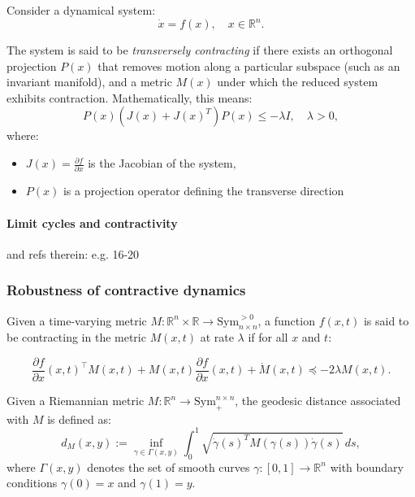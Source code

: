 \documentclass{article}
\theoremstyle{definition} \newtheorem{definition}{Definition}
\theoremstyle{remark} \newtheorem{remark}{Remark}
\newcounter{ct}
\begin{document}
Consider a dynamical system:
\begin{equation}
    \dot{x} = f(x), \quad x \in \mathbb{R}^n.
\end{equation}

The system is said to be \textit{transversely contracting} if there exists an orthogonal projection $P(x)$ that removes motion along a particular subspace (such as an invariant manifold), and a metric $M(x)$ under which the reduced system exhibits contraction. Mathematically, this means:
\begin{equation}
    P(x) (J(x) + J(x)^T) P(x) \leq -\lambda I, \quad \lambda > 0,
\end{equation}
where:
\begin{itemize}
    \item $J(x) = \frac{\partial f}{\partial x}$ is the Jacobian of the system,
    \item $P(x)$ is a projection operator defining the transverse direction
\end{itemize}


\paragraph{Limit cycles and contractivity}%
\citep{manchester2014transverse} and refs therein: e.g. 16-20


\subsubsection{Robustness of contractive dynamics}\label{sec:contractive_robustness}

Given a time-varying metric \( M : \mathbb{R}^n \times \mathbb{R} \to \text{Sym}_{n \times n}^{>0} \), a function \( f(x,t) \) is said to be contracting in the metric \( M(x,t) \) at rate \( \lambda \) if for all \( x \) and \( t \):

\[
\frac{\partial f}{\partial x} (x,t)^{\top} M(x,t) + M(x,t) \frac{\partial f}{\partial x} (x,t) + \dot{M} (x,t) \preceq -2\lambda M(x,t).
\]


Given a Riemannian metric \( M: \mathbb{R}^n \to \text{Sym}_{+}^{n \times n} \), the geodesic distance associated with \( M \) is defined as:
\begin{equation}
    d_M(x, y) := \inf_{\gamma \in \Gamma(x,y)} \int_0^1 \sqrt{\dot{\gamma}(s)^T M(\gamma(s)) \dot{\gamma}(s)} \, ds,
\end{equation}
where \( \Gamma(x,y) \) denotes the set of smooth curves \( \gamma: [0,1] \to \mathbb{R}^n \) with boundary conditions \( \gamma(0) = x \) and \( \gamma(1) = y \).
\end{document}
